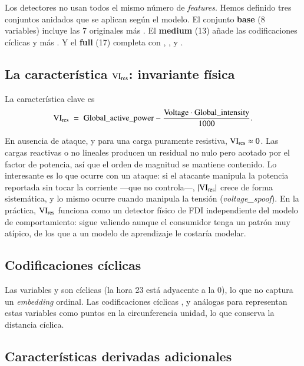 Los detectores no usan todos el mismo número de \textit{features}. Hemos definido tres conjuntos anidados que se aplican según el modelo. El conjunto \textbf{base} (8 variables) incluye las 7 originales más . El \textbf{medium} (13) añade las codificaciones cíclicas  y  más . Y el \textbf{full} (17) completa con , ,  y .

\subsection{La característica $\mathrm{VI}_{\text{res}}$: invariante física}

La característica clave es
\begin{equation}
\mathrm{VI}_{\text{res}} \;=\; \mathrm{Global\_active\_power} - \frac{\mathrm{Voltage} \cdot \mathrm{Global\_intensity}}{1000}.
\label{eq:vires}
\end{equation}

En ausencia de ataque, y para una carga puramente resistiva, $\mathrm{VI}_{\text{res}} \approx 0$. Las cargas reactivas o no lineales producen un residual no nulo pero acotado por el factor de potencia, así que el orden de magnitud se mantiene contenido. Lo interesante es lo que ocurre con un ataque: si el atacante manipula la potencia reportada sin tocar la corriente ---que no controla---, $|\mathrm{VI}_{\text{res}}|$ crece de forma sistemática, y lo mismo ocurre cuando manipula la tensión (\textit{voltage\_spoof}). En la práctica, $\mathrm{VI}_{\text{res}}$ funciona como un detector físico de FDI independiente del modelo de comportamiento: sigue valiendo aunque el consumidor tenga un patrón muy atípico, de los que a un modelo de aprendizaje le costaría modelar.

\subsection{Codificaciones cíclicas}

Las variables  y  son cíclicas (la hora 23 está adyacente a la 0), lo que no captura un \textit{embedding} ordinal. Las codificaciones cíclicas ,  y análogas para  representan estas variables como puntos en la circunferencia unidad, lo que conserva la distancia cíclica.

\subsection{Características derivadas adicionales}

